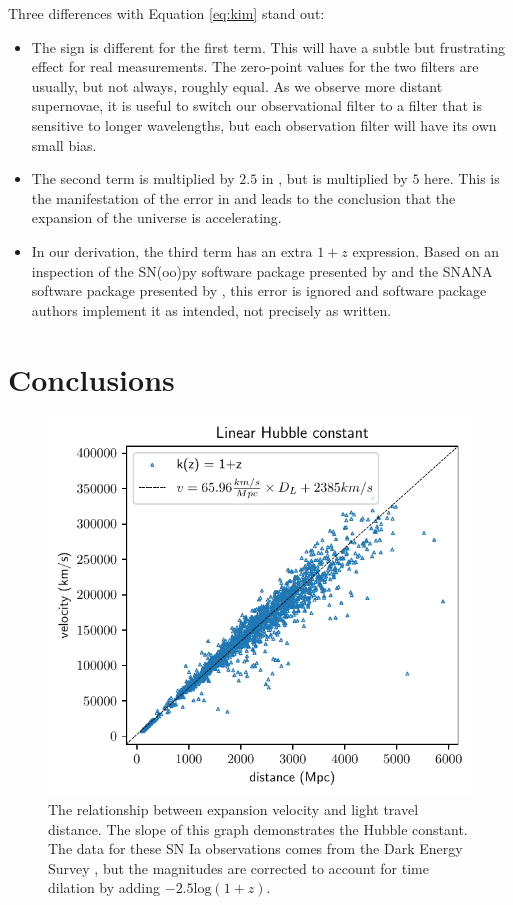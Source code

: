 \documentclass[aps,prl,reprint,amsmath,floatfix]{revtex4-2}
\begin{document}
Three differences with Equation \ref{eq:kim} stand out:

\begin{itemize}
  \item The sign is different for the first term. This will have a subtle but
  frustrating effect for real measurements. The zero-point values for the two
  filters are usually, but not always, roughly equal. As we observe more
  distant supernovae, it is useful to switch our observational filter to a
  filter that is sensitive to longer wavelengths, but each observation filter will
  have its own small bias.

  \item The second term is multiplied by $2.5$ in \citet{kim1996}, but is
  multiplied by $5$ here. This is the manifestation of the error in
  \citet{tolman1930} and leads to the conclusion that the expansion of the
  universe is accelerating.

  \item In our derivation, the third term has an extra $1 + z$ expression.
  Based on an inspection of the SN(oo)py software package presented by
  \citet{burns2010} and the SNANA software package presented by
  \citet{kessler2009}, this error is ignored and software package authors
  implement it as intended, not precisely as written.
\end{itemize}

\section{Conclusions}

\begin{figure}
  \includegraphics[width=\columnwidth]{velocity_vs_distance.pdf}
  \caption{The relationship between expansion velocity and light travel
  distance. The slope of this graph demonstrates the Hubble constant. The data
  for these SN Ia observations comes from the Dark Energy Survey
  \citep{vincenzi2024}, but the magnitudes are corrected to account for time
  dilation by adding $-2.5 \text{log}(1 + z)$.
  }
\label{fig:expansion}
\end{figure}
\end{document}
